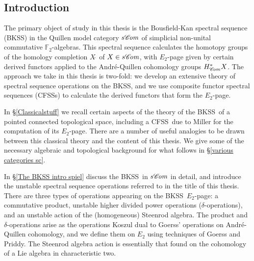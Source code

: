 \documentclass[11pt]{amsart} \renewcommand{\baselinestretch}{1.2}
\theoremstyle{plain}
\numberwithin{equation}{section} %
\theoremstyle{plain}
\numberwithin{equation}{chapter} %
\newcommand{\scrC}{\mathscr{C}}
\newcommand{\F}{\mathbb{F}}
\newcommand{\algs}{{\scrC\!\textit{\normalfont\textit{om}}}}
\newcommand{\Ftwo}{\F_2}
\newcommand{\BKSS}{BKSS}
\newcommand{\CFSS}{CFSS}
\newcommand{\CFSSs}{CFSSs}
\newcommand{\SectionOrChapter}[1]{\section{\textbf{#1}}}
\begin{document}
\begin{Introduction}
\SectionOrChapter{Introduction}
\label{intropart1}
The primary object of study in this thesis is the Bousfield-Kan spectral sequence (\BKSS) in the Quillen model category $s\algs$ of simplicial non-unital commutative  $\Ftwo$-algebras. This spectral sequence  calculates the homotopy groups of the homology completion $X\hat{\ }$ of $X\in s\algs$, with $E_2$-page given by certain derived functors applied to the Andr\'e-Quillen cohomology groups $H^*_{\algs}X$. The approach we take in this thesis is two-fold: we develop an extensive theory of spectral sequence operations on the \BKSS, and we use composite functor spectral sequences (\CFSSs) to calculate the derived functors that form the $E_2$-page.

In \S\ref{Classicalstuff} we recall certain aspects of the theory of the \BKSS\ of a pointed connected topological space, including a \CFSS\ due to Miller for the computation of its $E_2$-page. There are a number of useful analogies to be drawn between this classical theory and the content of this thesis.
We give some of the necessary algebraic and topological background for what follows  in \S\ref{various categories sc}.

In \S\ref{The BKSS intro spiel} discuss the \BKSS\ in $s\algs$ in detail, and introduce the unstable spectral sequence operations referred to in the title of this thesis. There are three types of operations appearing on the \BKSS\ $E_2$-page: a commutative product, unstable higher divided power operations ($\delta$-operations), and an unstable action of the (homogeneous) Steenrod algebra. The product and $\delta$-operations arise as the operations Koszul dual to Goerss' operations on Andr\'e-Quillen cohomology, and we define them on $E_2$ using techniques of Goerss and Priddy. The Steenrod algebra action is essentially that found on the cohomology of a Lie algebra in characteristic two.



\end{Introduction}
\end{document}
